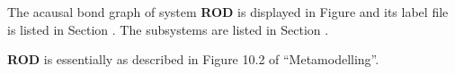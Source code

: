 

   The acausal bond graph of system \textbf{ROD} is
   displayed in Figure  and its label
   file is listed in Section .
   The subsystems are listed in Section .

{\bf ROD} is essentially as described in Figure 10.2 of
``Metamodelling''.
